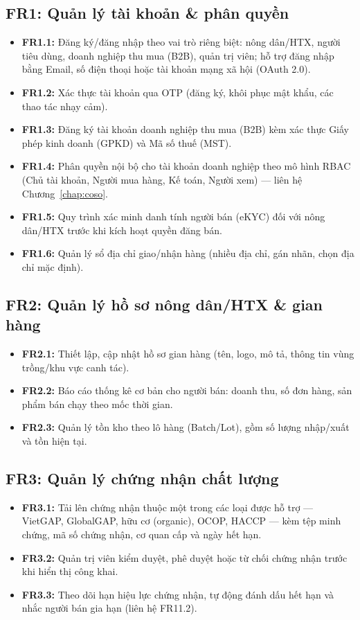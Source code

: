 \subsection{FR1: Quản lý tài khoản \& phân quyền}
\begin{itemize}
    \item \textbf{FR1.1:} Đăng ký/đăng nhập theo vai trò riêng biệt: nông
    dân/HTX, người tiêu dùng, doanh nghiệp thu mua (B2B), quản trị viên; hỗ
    trợ đăng nhập bằng Email, số điện thoại hoặc tài khoản mạng xã hội
    (OAuth 2.0).
    \item \textbf{FR1.2:} Xác thực tài khoản qua OTP (đăng ký, khôi phục mật
    khẩu, các thao tác nhạy cảm).
    \item \textbf{FR1.3:} Đăng ký tài khoản doanh nghiệp thu mua (B2B) kèm
    xác thực Giấy phép kinh doanh (GPKD) và Mã số thuế (MST).
    \item \textbf{FR1.4:} Phân quyền nội bộ cho tài khoản doanh nghiệp theo
    mô hình RBAC (Chủ tài khoản, Người mua hàng, Kế toán, Người xem) --- liên
    hệ Chương~\ref{chap:coso}.
    \item \textbf{FR1.5:} Quy trình xác minh danh tính người bán (eKYC) đối
    với nông dân/HTX trước khi kích hoạt quyền đăng bán.
    \item \textbf{FR1.6:} Quản lý sổ địa chỉ giao/nhận hàng (nhiều địa chỉ,
    gán nhãn, chọn địa chỉ mặc định).
\end{itemize}

\subsection{FR2: Quản lý hồ sơ nông dân/HTX \& gian hàng}
\begin{itemize}
    \item \textbf{FR2.1:} Thiết lập, cập nhật hồ sơ gian hàng (tên, logo,
    mô tả, thông tin vùng trồng/khu vực canh tác).
    \item \textbf{FR2.2:} Báo cáo thống kê cơ bản cho người bán: doanh thu,
    số đơn hàng, sản phẩm bán chạy theo mốc thời gian.
    \item \textbf{FR2.3:} Quản lý tồn kho theo lô hàng (Batch/Lot), gồm số
    lượng nhập/xuất và tồn hiện tại.
\end{itemize}

\subsection{FR3: Quản lý chứng nhận chất lượng}
\begin{itemize}
    \item \textbf{FR3.1:} Tải lên chứng nhận thuộc một trong các loại được
    hỗ trợ --- VietGAP, GlobalGAP, hữu cơ (organic), OCOP, HACCP --- kèm tệp
    minh chứng, mã số chứng nhận, cơ quan cấp và ngày hết hạn.
    \item \textbf{FR3.2:} Quản trị viên kiểm duyệt, phê duyệt hoặc từ chối
    chứng nhận trước khi hiển thị công khai.
    \item \textbf{FR3.3:} Theo dõi hạn hiệu lực chứng nhận, tự động đánh dấu
    hết hạn và nhắc người bán gia hạn (liên hệ FR11.2).
\end{itemize}

